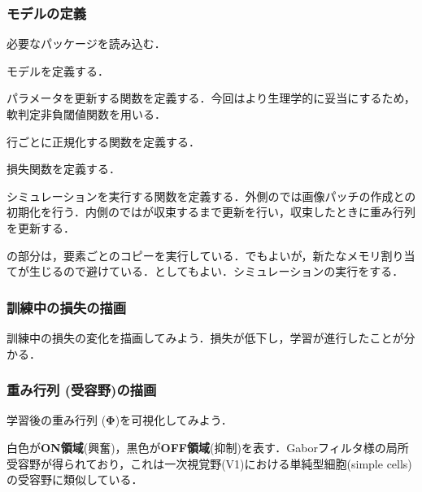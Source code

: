 \subsubsection{モデルの定義}
必要なパッケージを読み込む．

モデルを定義する．

パラメータを更新する関数を定義する．今回はより生理学的に妥当にするため，軟判定非負閾値関数を用いる．

行ごとに正規化する関数を定義する．

損失関数を定義する．

シミュレーションを実行する関数を定義する．外側のでは画像パッチの作成との初期化を行う．内側のではが収束するまで更新を行い，収束したときに重み行列を更新する．

の部分は，要素ごとのコピーを実行している．でもよいが，新たなメモリ割り当てが生じるので避けている．としてもよい．シミュレーションの実行をする．

\subsubsection{訓練中の損失の描画}
訓練中の損失の変化を描画してみよう．損失が低下し，学習が進行したことが分かる．


\subsubsection{重み行列 (受容野)の描画}
学習後の重み行列  ($\mathbf{\Phi}$)を可視化してみよう．


白色が\textbf{ON領域}(興奮)，黒色が\textbf{OFF領域}(抑制)を表す．Gaborフィルタ様の局所受容野が得られており，これは一次視覚野(V1)における単純型細胞(simple cells)の受容野に類似している．
